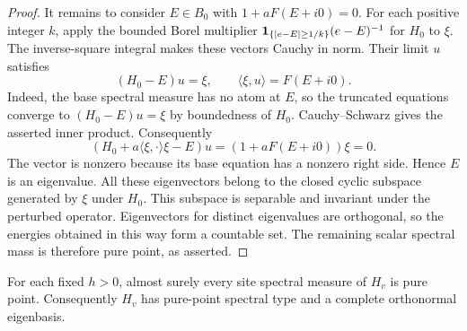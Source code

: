 \begin{proof}
It remains to consider $E\in B_0$ with $1+aF(E+i0)=0$. For each
positive integer $k$, apply the bounded Borel multiplier
$\mathbf 1_{\{|e-E|\ge1/k\}}(e-E)^{-1}$ for $H_0$ to $\xi$.
The inverse-square integral makes these vectors Cauchy in norm.
Their limit $u$ satisfies
\[
 (H_0-E)u=\xi,\qquad \langle\xi,u\rangle=F(E+i0).
\]
Indeed, the base spectral measure has no atom at $E$, so the truncated
equations converge to $(H_0-E)u=\xi$ by boundedness of $H_0$.
Cauchy--Schwarz gives the asserted inner product. Consequently
\[
 (H_0+a\langle\xi,\cdot\rangle\xi-E)u
       =(1+aF(E+i0))\xi=0.
\]
The vector is nonzero because its base equation has a nonzero right
side. Hence $E$ is an eigenvalue. All these eigenvectors belong to the
closed cyclic subspace generated by $\xi$ under $H_0$. This subspace is
separable and invariant under the perturbed operator. Eigenvectors for
distinct eigenvalues are orthogonal, so the energies obtained in this
way form a countable set. The remaining scalar spectral mass is
therefore pure point, as asserted.
\end{proof}

\begin{proposition}\label{spec:readout}
For each fixed $h>0$, almost surely every site spectral measure of
$H_v$ is pure point. Consequently $H_v$ has pure-point spectral type
and a complete orthonormal eigenbasis.
\end{proposition}

